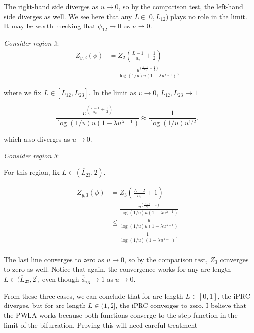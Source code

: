 The right-hand side diverges as $u \rightarrow 0$, so by the comparison test, the left-hand side diverges as well.  We see here that any $L \in [0,\overline L_{12})$ plays no role in the limit.  It may be worth checking that $\overline\phi_{12} \rightarrow 0$ as $u \rightarrow 0$.


\textit{Consider region 2}:
\begin{equation}
\begin{split}
 Z_{y,2}(\phi) &= Z_2\left (\frac{L-1}{a_2}+\frac{1}{2} \right) \\
 &= \frac{u^{\left ( \frac{L-1}{a_2}+\frac{1}{2} \right )}}{\log(1/u) u (1-\lambda u^{\lambda-1})},
\end{split}
\end{equation}

where we fix $L \in [\overline L_{12}, \overline L_{23}]$.  In the limit as $u \rightarrow 0$, $\overline L_{12}, \overline L_{23} \rightarrow 1$
 
\begin{equation}
 \frac{u^{\left ( \frac{L-1}{a_2}+\frac{1}{2} \right )}}{\log(1/u) u (1-\lambda u^{\lambda-1})} \approx \frac{1}{\log(1/u) u^{1/2}},
\end{equation}

which also diverges as $u \rightarrow 0$.

\textit{Consider region 3}:

For this region, fix $L \in (\overline L_{23},2)$.

\begin{equation}
\begin{split}
 Z_{y,3}(\phi) &= Z_3\left (\frac{L-2}{a_3}+1 \right) \\
 &= \frac{u^{\left ( \frac{L-2}{a_3}+1 \right )}}{\log(1/u) u (1-\lambda u^{\lambda-1})}\\
 &\leq  \frac{u}{\log(1/u) u (1-\lambda u^{\lambda-1})}\\
 &=  \frac{1}{\log(1/u) (1-\lambda u^{\lambda-1})}.\\
\end{split}
\end{equation}

The last line converges to zero as $u \rightarrow 0$, so by the comparison test, $Z_3$ converges to zero as well.  Notice that again, the convergence works for any arc length $L \in (\overline L_{23},2]$, even though $\overline\phi_{23} \rightarrow 1$ as $u \rightarrow 0$.

From these three cases, we can conclude that for arc length $L \in [0,1]$, the iPRC diverges, but for arc length $L \in (1,2]$, the iPRC converges to zero.  I believe that the PWLA works because both functions converge to the step function in the limit of the bifurcation.  Proving this will need careful treatment.

